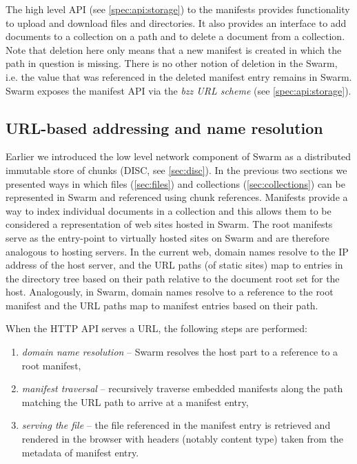 The high level API (see \ref{spec:api:storage}) to the manifests provides functionality to upload and download files and directories. It also provides an interface to add documents to a collection on a path and to delete a document from a collection. Note that deletion here only means that a new manifest is created in which the path in question is missing. There is no other notion of deletion in the Swarm, i.e. the value that was referenced in the deleted manifest entry remains in Swarm. Swarm exposes the manifest API via the \emph{bzz URL scheme} (see \ref{spec:api:storage}).

\subsection{URL-based addressing and name resolution\statusgreen}\label{sec:urls}

Earlier we introduced the low level network component of Swarm as a distributed immutable store of chunks (DISC, see \ref{sec:disc}). In the previous two sections we presented ways in which files (\ref{sec:files}) and collections (\ref{sec:collections}) can be represented in Swarm and referenced using chunk references. Manifests provide a way to index individual documents in a collection and this allows them to be considered a representation of web sites hosted in Swarm. The root manifests serve as the entry-point to virtually hosted sites on Swarm and are therefore analogous to hosting servers. In the current web, domain names resolve to the IP address of the host server, and the URL paths (of static sites) map to entries in the directory tree based on their path relative to the document root set for the host.
Analogously, in Swarm, domain names resolve to a reference to the root manifest and the URL paths map to manifest entries based on their path.  

When the HTTP API serves a URL, the following steps are performed:

\begin{enumerate}
    \item \emph{domain name resolution} -- Swarm resolves the host part to a reference to a root manifest,
    \item \emph{manifest traversal} -- recursively traverse embedded manifests along the path matching the URL path to arrive at a manifest entry,
    \item \emph{serving the file} -- the file referenced in the manifest entry is retrieved and rendered in the browser with headers (notably content type) taken from  the metadata of manifest entry.
\end{enumerate}

